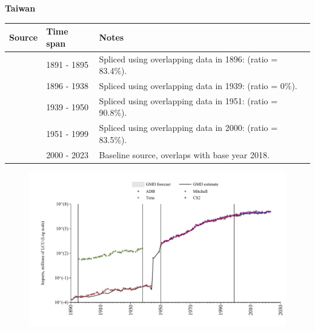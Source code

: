 \documentclass[12pt,a4paper,landscape]{article}
\begin{document}
\begin{adjustbox}{max totalsize={\paperwidth}{\paperheight},center}
\begin{minipage}[t][\textheight][t]{\textwidth}
\vspace*{0.5cm}
{}
\begin{center}
{\Large\bfseries Taiwan}
\end{center}
\vspace{0.5cm}
\begin{table}[H]
\centering
\small
\begin{tabular}{|l|l|l|}
\hline
\textbf{Source} & \textbf{Time span} & \textbf{Notes} \\
\hline
\rowcolor{white}\cite{Mitchell}& 1891 - 1895 &Spliced using overlapping data in 1896: (ratio = 83.4\%).\\
\rowcolor{lightgray}\cite{Tena}& 1896 - 1938 &Spliced using overlapping data in 1939: (ratio = 0\%).\\
\rowcolor{white}\cite{Mitchell}& 1939 - 1950 &Spliced using overlapping data in 1951: (ratio = 90.8\%).\\
\rowcolor{lightgray}\cite{CS2_TWN}& 1951 - 1999 &Spliced using overlapping data in 2000: (ratio = 83.5\%).\\
\rowcolor{white}\cite{ADB}& 2000 - 2023 &Baseline source, overlaps with base year 2018.\\
\hline
\end{tabular}
\end{table}
\begin{figure}[H]
\centering
\includegraphics[width=\textwidth,height=0.6\textheight,keepaspectratio]{graphs/TWN_imports.pdf}
\end{figure}
\end{minipage}
\end{adjustbox}
\end{document}
